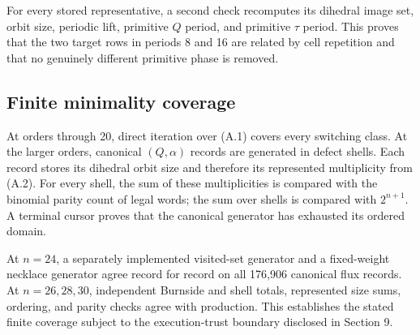 For every stored representative, a second check recomputes its dihedral image
set, orbit size, periodic lift, primitive \(Q\) period, and primitive \(\tau\)
period. This proves that the two target rows in periods 8 and 16 are related by
cell repetition and that no genuinely different primitive phase is removed.

\subsection{Finite minimality coverage}

At orders through 20, direct iteration over (A.1) covers every switching
class. At the larger orders, canonical \((Q,\alpha)\) records are generated in
defect shells. Each record stores its dihedral orbit size and therefore its
represented multiplicity from (A.2). For every shell, the sum of these
multiplicities is compared with the binomial parity count of legal words; the
sum over shells is compared with \(2^{n+1}\). A terminal cursor proves that the
canonical generator has exhausted its ordered domain.

At \(n=24\), a separately implemented visited-set generator and a fixed-weight
necklace generator agree record for record on all 176,906 canonical flux
records. At \(n=26,28,30\), independent Burnside and shell totals, represented
size sums, ordering, and parity checks agree with production. This establishes
the stated finite coverage subject to the execution-trust boundary disclosed
in Section 9.

